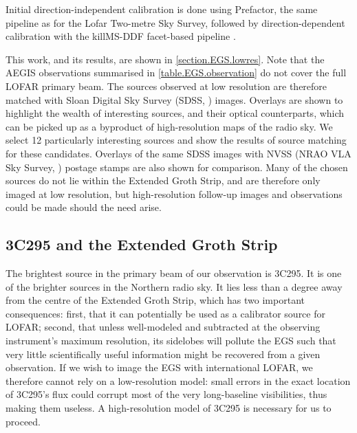 \pg
Initial direction-independent calibration is done using Prefactor, the same pipeline as for the Lofar Two-metre Sky Survey, followed by direction-dependent calibration with the killMS-DDF facet-based pipeline . %

\pg
This work, and its results, are shown in \cref{section.EGS.lowres}. Note that the AEGIS observations summarised in \cref{table.EGS.observation} do not cover the full LOFAR primary beam. The sources observed at low resolution are therefore matched with Sloan Digital Sky Survey (SDSS, ) images. Overlays are shown to highlight the wealth of interesting sources, and their optical counterparts, which can be picked up as a byproduct of high-resolution maps of the radio sky. We select 12 particularly interesting sources and show the results of source matching for these candidates. Overlays of the same SDSS images with NVSS (NRAO VLA Sky Survey, ) postage stamps are also shown for comparison. Many of the chosen sources do not lie within the Extended Groth Strip, and are therefore only imaged at low resolution, but high-resolution follow-up images and observations could be made should the need arise.


\subsection{3C295 and the Extended Groth Strip}


\pg
The brightest source in the primary beam of our observation is 3C295. It is one of the brighter sources in the Northern radio sky. It lies less than a degree away from the centre of the Extended Groth Strip, which has two important consequences: first, that it can potentially be used as a calibrator source for LOFAR; second, that unless well-modeled and subtracted at the observing instrument's maximum resolution, its sidelobes will pollute the EGS such that very little scientifically useful information might be recovered from a given observation. If we wish to image the EGS with international LOFAR, we therefore cannot rely on a low-resolution model: small errors in the exact location of 3C295's flux could corrupt most of the very long-baseline visibilities, thus making them useless. A high-resolution model of 3C295 is necessary for us to proceed.

